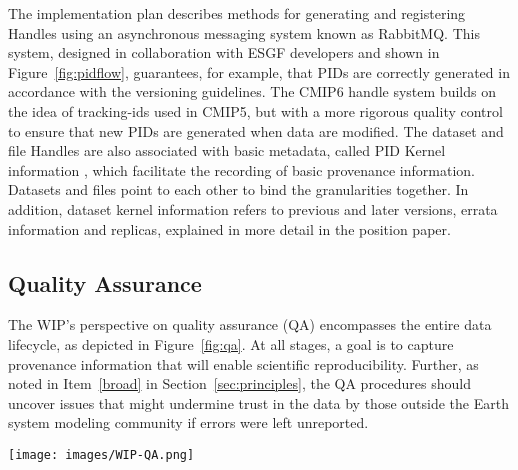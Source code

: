 \documentclass[gmd,manuscript]{copernicus}
\begin{document}
The implementation plan describes methods for generating and
registering Handles using an asynchronous messaging system known as
RabbitMQ. This system, designed in collaboration with ESGF developers
and shown in Figure~\ref{fig:pidflow}, guarantees, for example, that PIDs are
correctly generated in accordance with the versioning guidelines. The
CMIP6 handle system builds on the idea of tracking-ids used in CMIP5,
but with a more rigorous quality control to ensure that new PIDs are
generated when data are modified. The dataset and file Handles are
also associated with basic metadata, called PID Kernel information
\citep{ref:zhouetal2018}, which facilitate the recording of basic
provenance information. Datasets and files point to each other to bind
the granularities together. In addition, dataset kernel information
refers to previous and later versions, errata information and
replicas, explained in more detail in the position paper.

\subsection{Quality Assurance}
\label{sec:qa}

The WIP's perspective on quality assurance (QA) encompasses the entire
data lifecycle, as depicted in Figure~\ref{fig:qa}. At all stages, a
goal is to capture provenance information that will enable scientific
reproducibility. Further, as noted in Item~\ref{broad} in
Section~\ref{sec:principles}, the QA procedures should uncover issues
that might undermine trust in the data by those outside the Earth
system modeling community if errors were left unreported.

\begin{figure*}
  \begin{center}
    \texttt{[image: images/WIP-QA.png]}
  \end{center}
  \caption{Schematic of the phases of quality assurance, with earlier
    stages in the hands of modeling centers (left), and more formal
    long-term data curation stages at right. Quality assurance is
    applied both to the data (D, above) as well as the metadata (M)
    describing the data. Figure drawn from the WIP's Quality Assurance
    position paper.}
  \label{fig:qa}
\end{figure*}
\end{document}
